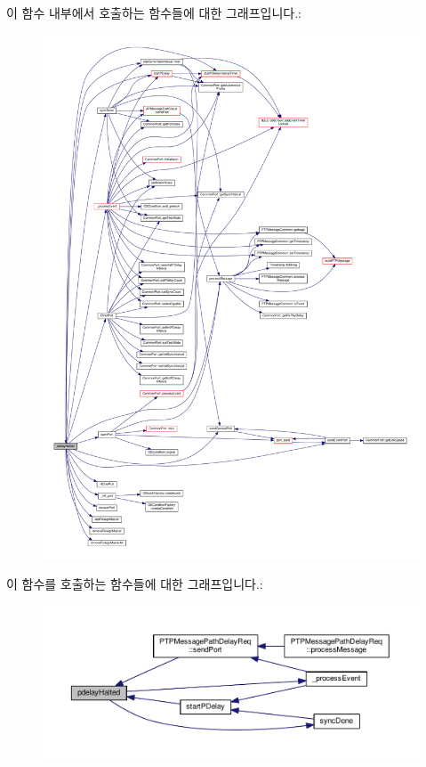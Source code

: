 이 함수 내부에서 호출하는 함수들에 대한 그래프입니다.\+:
\nopagebreak
\begin{figure}[H]
\begin{center}
\leavevmode
\includegraphics[width=350pt]{class_ether_port_a356f9b85961c457162c78205f18ad572_cgraph}
\end{center}
\end{figure}




이 함수를 호출하는 함수들에 대한 그래프입니다.\+:
\nopagebreak
\begin{figure}[H]
\begin{center}
\leavevmode
\includegraphics[width=350pt]{class_ether_port_a356f9b85961c457162c78205f18ad572_icgraph}
\end{center}
\end{figure}



